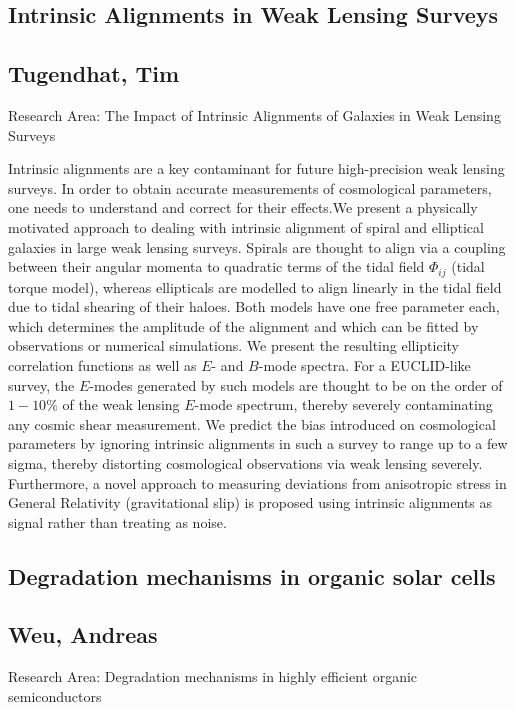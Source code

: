\subsection*{\centering \large Intrinsic Alignments in Weak Lensing Surveys}
\subsection*{\centering \normalsize Tugendhat, Tim}
Research Area: The Impact of Intrinsic Alignments of Galaxies in Weak Lensing Surveys\newline

\noindent Intrinsic alignments are a key contaminant for future high-precision weak lensing surveys. In order to obtain accurate measurements of cosmological parameters, one needs to understand and correct for their effects.We present a physically motivated approach to dealing with intrinsic alignment of spiral and elliptical galaxies in large weak lensing surveys. Spirals are thought to align via a coupling between their angular momenta to quadratic terms of the tidal field $\Phi_{ij}$ (tidal torque model), whereas ellipticals are modelled to align linearly in the tidal field due to tidal shearing of their haloes. Both models have one free parameter each, which determines the amplitude of the alignment and which can be fitted by observations or numerical simulations. We present the resulting ellipticity correlation functions as well as $E$- and $B$-mode spectra. For a EUCLID-like survey, the $E$-modes generated by such models are thought to be on the order of $1-10\%$ of the weak lensing $E$-mode spectrum, thereby severely contaminating any cosmic shear measurement. We predict the bias introduced on cosmological parameters by ignoring intrinsic alignments in such a survey to range up to a few sigma, thereby distorting cosmological observations via weak lensing severely. Furthermore, a novel approach to measuring deviations from anisotropic stress in General Relativity (gravitational slip) is proposed using intrinsic alignments as signal rather than treating as noise.
\subsection*{\centering \large Degradation mechanisms in organic solar cells}
\subsection*{\centering \normalsize Weu, Andreas}
Research Area: Degradation mechanisms in highly efficient organic semiconductors\newline

